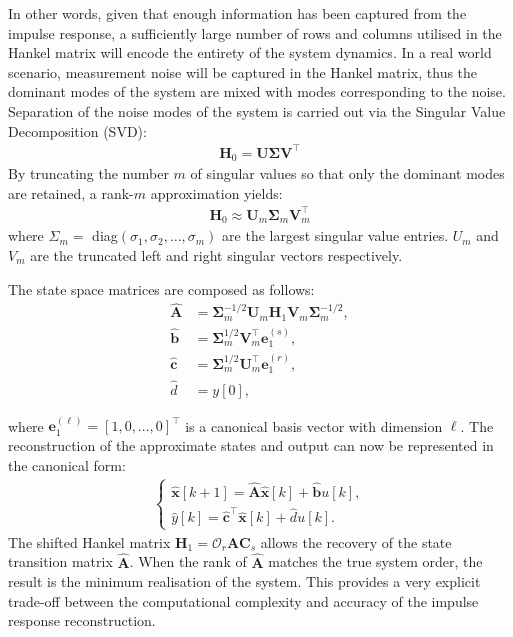 In other words, given that enough information has been captured from the impulse response, a sufficiently large number of rows and columns utilised in the Hankel matrix will encode the entirety of the system dynamics. In a real world scenario, measurement noise will be captured in the Hankel matrix, thus the dominant modes of the system are mixed with modes corresponding to the noise. Separation of the noise modes of the system is carried out via the Singular Value Decomposition (SVD):
\begin{align}
\label{eq:svd}
    \mathbf{H}_0 = \mathbf{U \Sigma V}^\top
\end{align}
By truncating the number $m$ of singular values so that only the dominant modes are retained, a rank-$m$ approximation yields:
\begin{align}
\label{eq:svdm}
    \mathbf{H}_0 \approx \mathbf{U}_m \mathbf{\Sigma}_m \mathbf{V}_{m}^{\top}
\end{align}
where $\Sigma_m =$ diag$(\sigma_1,\sigma_2, \dots, \sigma_m)$ are the largest singular value entries. $U_m$ and $V_m$ are the truncated left and right singular vectors respectively.

The state space matrices are composed as follows:
\begin{align}
\label{eq:ss}
\hat{\mathbf{A}} &= \mathbf{\Sigma}_{m}^{-1/2} \mathbf{U}_m \mathbf{H}_1 \mathbf{V}_m \mathbf{\Sigma}_{m}^{-1/2}, \\
\hat{\mathbf{b}} &= \mathbf{\Sigma}_{m}^{1/2} \mathbf{V}_m^{\top} \mathbf{e}_{1}^{(s)}, \\
\hat{\mathbf{c}} &= \mathbf{\Sigma}_{m}^{1/2} \mathbf{U}_{m}^{\top} \mathbf{e}_{1}^{(r)}, \\
\hat{d} &= y[0],
\end{align}

where $\mathbf{e}_{1}^{(\ell)} = [1, 0, ..., 0]^{\top}$ is a canonical basis vector with dimension $\ell$. The reconstruction of the approximate states and output can now be represented in the canonical form:
\begin{align}
\label{eq:output}
\begin{cases}
    \hat{\mathbf{x}}[k+1] = \hat{\mathbf{A}} \hat{\mathbf{x}} [k] + \hat{\mathbf{b}} u[k], \\
    \hat{y} [k] = \hat{\mathbf{c}}^{\top} \hat{\mathbf{x}} [k] + \hat{d} u[k].
\end{cases}
\end{align}
The shifted Hankel matrix $\mathbf{H}_1 = \mathcal{O}_r \mathbf{A} \mathbf{C}_s$ allows the recovery of the state transition matrix $\hat{\mathbf{A}}$. When the rank of $\hat{\mathbf{A}}$ matches the true system order, the result is the minimum realisation of the system. This provides a very explicit trade-off between the computational complexity and accuracy of the impulse response reconstruction.

